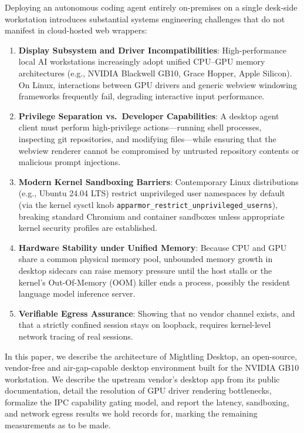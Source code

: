 \documentclass[11pt]{article}
\newcommand{\code}[1]{\texttt{#1}}
\begin{document}
Deploying an autonomous coding agent entirely on-premises on a single desk-side workstation introduces
substantial systems engineering challenges that do not manifest in cloud-hosted web wrappers:
\begin{enumerate}
    \item \textbf{Display Subsystem and Driver Incompatibilities}: High-performance local AI workstations
    increasingly adopt unified CPU--GPU memory architectures (e.g., NVIDIA Blackwell GB10, Grace Hopper, Apple
    Silicon). On Linux, interactions between GPU drivers and generic webview windowing frameworks
    frequently fail, degrading interactive input performance.
    \item \textbf{Privilege Separation vs.\ Developer Capabilities}: A desktop agent client must perform high-privilege
    actions—running shell processes, inspecting git repositories, and modifying files—while ensuring that the
    webview renderer cannot be compromised by untrusted repository contents or malicious prompt injections.
    \item \textbf{Modern Kernel Sandboxing Barriers}: Contemporary Linux distributions (e.g., Ubuntu 24.04 LTS)
    restrict unprivileged user namespaces by default (via the kernel sysctl knob
    \code{apparmor\_restrict\_unprivileged\_userns}), breaking standard Chromium and container sandboxes unless
    appropriate kernel security profiles are established.
    \item \textbf{Hardware Stability under Unified Memory}: Because CPU and GPU share a common physical memory pool,
    unbounded memory growth in desktop sidecars can raise memory pressure until the host stalls or the kernel's
    Out-Of-Memory (OOM) killer ends a process, possibly the resident language model inference server.
    \item \textbf{Verifiable Egress Assurance}: Showing that no vendor channel exists, and that a strictly confined
    session stays on loopback, requires kernel-level network tracing of real sessions.
\end{enumerate}

In this paper, we describe the architecture of Mightling Desktop, an open-source, vendor-free and air-gap-capable
desktop environment built for the NVIDIA GB10 workstation. We describe the upstream vendor's desktop app from its public
documentation, detail the resolution of GPU driver rendering bottlenecks, formalize the IPC capability
gating model, and report the latency, sandboxing, and network egress results we hold records for, marking the
remaining measurements as to be made.
\end{document}
